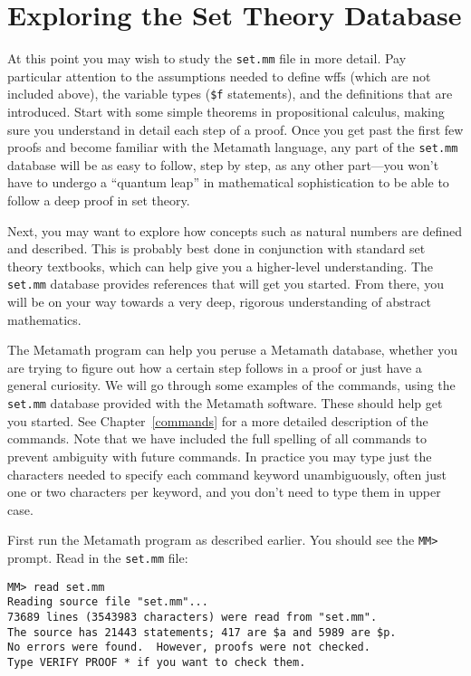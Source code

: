 \section{Exploring the Set Theory Database}\label{exploring}

At this point you may wish to study the \texttt{set.mm} file in more detail.  Pay particular
attention to the assumptions needed to define wffs (which are not included above), the variable types
(\texttt{\$f} statements), and the
definitions that are introduced.  Start with some simple theorems in
propositional calculus, making sure you understand in detail each step
of a proof.  Once you get past the first few proofs and become familiar
with the Metamath language, any part of the \texttt{set.mm} database
will be as easy to follow, step by step, as any other part---you won't
have to undergo a ``quantum leap'' in mathematical sophistication to be
able to follow a deep proof in set theory.

Next, you may want to explore how concepts such as natural numbers are
defined and described.  This is probably best done in conjunction with
standard set theory textbooks, which can help give you a higher-level
understanding.  The \texttt{set.mm} database provides references that will get
you started.  From there, you will be on your way towards a very deep,
rigorous understanding of abstract mathematics.

The Metamath program can help you peruse a Metamath data\-base,
wheth\-er you are trying to figure out how a certain step follows in a proof or
just have a general curiosity.  We will go through some examples of the
commands, using the \texttt{set.mm}
database provided with the Metamath software.  These should help get you
started.  See Chapter~\ref{commands} for a more detailed description of
the commands.  Note that we have included the full spelling of all commands to
prevent ambiguity with future commands.  In practice you may type just the
characters needed to specify each command keyword
unambiguously, often just one or two characters per keyword, and you don't
need to type them in upper
case.

First run the Metamath program as described earlier.  You should see the
\verb/MM>/ prompt.  Read in the \texttt{set.mm} file:

\begin{verbatim}
MM> read set.mm
Reading source file "set.mm"...
73689 lines (3543983 characters) were read from "set.mm".
The source has 21443 statements; 417 are $a and 5989 are $p.
No errors were found.  However, proofs were not checked.
Type VERIFY PROOF * if you want to check them.
\end{verbatim}

